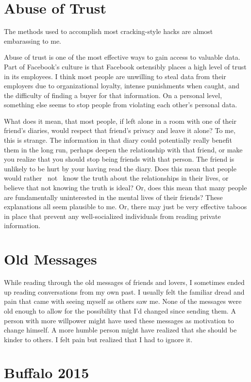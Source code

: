 \documentclass[12pt]{article}
\begin{document}
\section{Abuse of Trust}
The methods used to accomplish most cracking-style hacks are almost embarassing
to me. 

Abuse of trust is one of the most effective ways to gain access to valuable
data.  Part of Facebook's culture is that Facebook ostensibly places a high
level of trust in its employees.  I think most people are unwilling to steal
data from their employers due to organizational loyalty, intense punishments
when caught, and the difficulty of finding a buyer for that information.  On a
personal level, something else seems to stop people from violating each other's
personal data.

What does it mean, that most people, if left alone in a room with one of their
friend's diaries, would respect that friend's privacy and leave it alone?  To
me, this is strange.  The information in that diary could potentially really
benefit them in the long run, perhaps deepen the relationship with that friend,
or make you realize that you should stop being friends with that person.  The
friend is unlikely to be hurt by your having read the diary.  Does this mean
that people would rather ~not~ know the truth about the relationships in their
lives, or believe that not knowing the truth is ideal?  Or, does this mean that
many people are fundamentally uninterested in the mental lives of their friends?
These explanations all seem plausible to me.  Or, there may just be very
effective taboos in place that prevent any well-socialized individuals from
reading private information.

\section{Old Messages}
While reading through the old messages of friends and lovers, I sometimes ended
up reading conversations from my own past.  I usually felt the familiar dread
and pain that came  with seeing myself as others saw me.  None of the messages
were old enough to allow for the possibility that I'd changed since sending
them.  A person with more willpower might have used these messages as motivation
to change himself.  A more humble person might have realized that she should be
kinder to others.  I felt pain but realized that I had to ignore it.

\section{Buffalo 2015}
\end{document}
